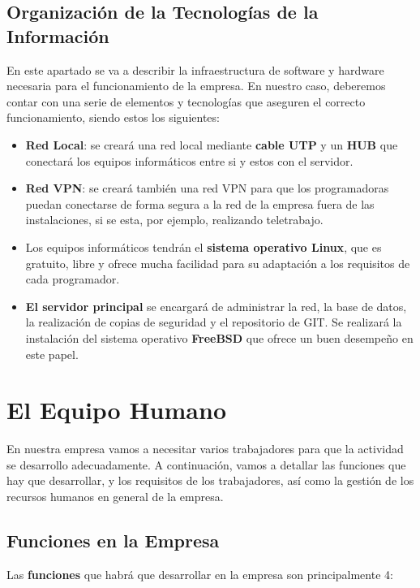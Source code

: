 \subsection{Organización de la Tecnologías de la Información}
En este apartado se va a describir la infraestructura de software y hardware necesaria para el funcionamiento de la empresa. En nuestro caso, deberemos contar con una serie de elementos y tecnologías que aseguren el correcto funcionamiento, siendo estos los siguientes:

\begin{itemize}
    \item \textbf{Red Local}: se creará una red local mediante \textbf{cable UTP} y un \textbf{HUB} que conectará los equipos informáticos entre si y estos con el servidor.

    \item \textbf{Red VPN}: se creará también una red VPN para que los programadoras puedan conectarse de forma segura a la red de la empresa fuera de las instalaciones, si se esta, por ejemplo, realizando teletrabajo.

    \item Los equipos informáticos tendrán el \textbf{sistema operativo Linux}, que es gratuito, libre y ofrece mucha facilidad para su adaptación a los requisitos de cada programador.

    \item \textbf{El servidor principal} se encargará de administrar la red, la base de datos, la realización de copias de seguridad y el repositorio de GIT. Se realizará la instalación del sistema operativo \textbf{FreeBSD} que ofrece un buen desempeño en este papel.
\end{itemize}


\section{El Equipo Humano}
En nuestra empresa vamos a necesitar varios trabajadores para que la actividad se desarrollo adecuadamente. A continuación, vamos a detallar las funciones que hay que desarrollar, y los requisitos de los trabajadores, así como la gestión de los recursos humanos en general de la empresa.

\subsection{Funciones en la Empresa}
Las \textbf{funciones} que habrá que desarrollar en la empresa son principalmente 4:

